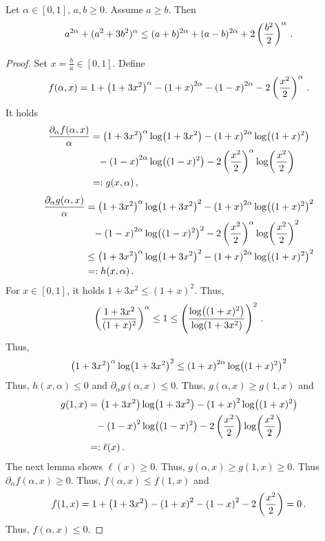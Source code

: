 %
\begin{lemma}
	Let $\alpha\in[0, 1]$, $a,b\geq0$. Assume $a\geq b$.
	Then
	\begin{equation*}
		a^{2\alpha}+(a^2  + 3 b^2)^\alpha \leq (a+b)^{2\alpha} + (a-b)^{2\alpha} + 2\left( \frac{b^2}{2} \right)^{\alpha}
		\, .
	\end{equation*}
\end{lemma}
%
\begin{proof}
	Set $x =\frac{b}{a} \in [0,1]$. Define
	\begin{equation*}
		f(\alpha,x) = 1+\left( 1+3x^2 \right)^\alpha-\left( 1+x \right)^{2\alpha}-\left( 1-x \right)^{2\alpha}-2\left( \frac{x^2}2 \right)^\alpha
		\, .
	\end{equation*}
	It holds
	\begin{align*}
		\frac{\partial_\alpha f(\alpha, x)}{\alpha} &= \left( 1+3x^2 \right)^\alpha \log\!\left( 1+3x^2 \right)-\left( 1+x \right)^{2\alpha}\log\!\left( (1+x)^2 \right)
		\\&\hphantom{=}
		-\left( 1-x \right)^{2\alpha}\log\!\left( (1-x)^2 \right)-2\left( \frac{x^2}2 \right)^\alpha\log\!\left( \frac{x^2}2 \right)
		\\&=:g(x,\alpha)\, ,
	\end{align*}
	\begin{align*}
		\frac{\partial_\alpha g(\alpha, x)}{\alpha} &=
		\left( 1+3x^2 \right)^\alpha \log\!\left( 1+3x^2 \right)^2-\left( 1+x \right)^{2\alpha}\log\!\left( (1+x)^2 \right)^2
		\\&\hphantom{=}
		-\left( 1-x \right)^{2\alpha}\log\!\left( (1-x)^2 \right)^2-2\left( \frac{x^2}2 \right)^\alpha\log\!\left( \frac{x^2}2 \right)^2
		\\&\leq
		\left( 1+3x^2 \right)^\alpha \log\!\left( 1+3x^2 \right)^2-\left( 1+x \right)^{2\alpha}\log\!\left( (1+x)^2 \right)^2
		\\&=:h(x,\alpha)
		\, .
	\end{align*}
	For $x\in[0,1]$, it holds $1+3x^2 \leq (1+x)^2$. Thus,
	\begin{equation*}
		\left( \frac{1+3x^2}{(1+x)^2} \right)^\alpha \leq 1 \leq \left( \frac{\log\!\left( (1+x)^2 \right)}{\log\!\left( 1+3x^2 \right)} \right)^2
		\, .
	\end{equation*}
	Thus,
	\begin{equation*}
		\left( 1+3x^2 \right)^\alpha \log\!\left( 1+3x^2 \right)^2 \leq \left( 1+x \right)^{2\alpha}\log\!\left( (1+x)^2 \right)^2
	\end{equation*}
	Thus, $h(x,\alpha) \leq 0$ and $\partial_\alpha g(\alpha,x) \leq 0$. Thus, $g(\alpha,x) \geq g(1,x)$ and
	\begin{align*}
		g(1,x) &= 
		\left( 1+3x^2 \right) \log\!\left( 1+3x^2 \right)-\left( 1+x \right)^{2}\log\!\left( (1+x)^2 \right)
		\\&\hphantom{=}
		-\left( 1-x \right)^{2}\log\!\left( (1-x)^2 \right)-2\left( \frac{x^2}2 \right)\log\!\left( \frac{x^2}2 \right)
		\\&=:\ell(x)
		\, .
	\end{align*}
	The next lemma shows $\ell(x) \geq 0$.
	Thus, $g(\alpha,x) \geq g(1,x) \geq 0$. Thus $\partial_\alpha f(\alpha,x) \geq 0$. Thus, $f(\alpha,x) \leq f(1,x)$ and
	\begin{equation*}
		f(1,x) = 1+\left( 1+3x^2 \right)-\left( 1+x \right)^{2}-\left( 1-x \right)^{2}-2\left( \frac{x^2}2 \right) = 0
		\, .
	\end{equation*}
	Thus, $f(\alpha, x) \leq 0$.
\end{proof}
